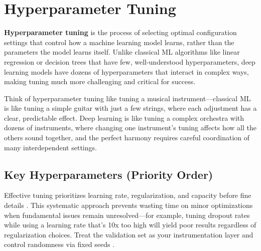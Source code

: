 
\section{Hyperparameter Tuning }
\label{sec:hyperparameter-tuning}

\textbf{Hyperparameter tuning} is the process of selecting optimal configuration settings that control how a machine learning model learns, rather than the parameters the model learns itself. Unlike classical ML algorithms like linear regression or decision trees that have few, well-understood hyperparameters, deep learning models have dozens of hyperparameters that interact in complex ways, making tuning much more challenging and critical for success.

\begin{example}
Think of hyperparameter tuning like tuning a musical instrument—classical ML is like tuning a simple guitar with just a few strings, where each adjustment has a clear, predictable effect. Deep learning is like tuning a complex orchestra with dozens of instruments, where changing one instrument's tuning affects how all the others sound together, and the perfect harmony requires careful coordination of many interdependent settings.
\end{example}


\subsection{Key Hyperparameters (Priority Order)}

Effective tuning prioritizes learning rate, regularization, and capacity before fine details . This systematic approach prevents wasting time on minor optimizations when fundamental issues remain unresolved—for example, tuning dropout rates while using a learning rate that's 10x too high will yield poor results regardless of regularization choices. Treat the validation set as your instrumentation layer and control randomness via fixed seeds \textcite{GoodfellowEtAl2016,Prince2023,D2LChapterOptimization}.


